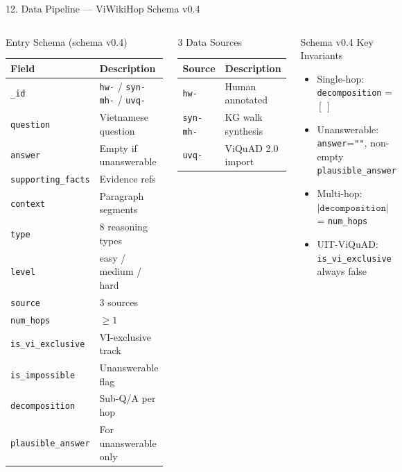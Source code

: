 \documentclass[aspectratio=169]{beamer}
\begin{document}
\begin{frame}[shrink=20]{12. Data Pipeline — ViWikiHop Schema v0.4}
\begin{columns}[T]
\begin{block}{Entry Schema (schema v0.4)}
{\scriptsize
\begin{tabular}{@{}lp{3.2cm}@{}}
\toprule
\textbf{Field} & \textbf{Description} \\
\midrule
\texttt{\_id}           & \texttt{hw-} / \texttt{syn-mh-} / \texttt{uvq-} \\
\texttt{question}       & Vietnamese question \\
\texttt{answer}         & Empty if unanswerable \\
\texttt{supporting\_facts} & Evidence refs \\
\texttt{context}        & Paragraph segments \\
\texttt{type}           & 8 reasoning types \\
\texttt{level}          & easy / medium / hard \\
\texttt{source}         & 3 sources \\
\texttt{num\_hops}      & $\geq 1$ \\
\texttt{is\_vi\_exclusive} & VI-exclusive track \\
\texttt{is\_impossible} & Unanswerable flag \\
\texttt{decomposition}  & Sub-Q/A per hop \\
\texttt{plausible\_answer} & For unanswerable only \\
\bottomrule
\end{tabular}
}
\end{block}

\begin{block}{3 Data Sources}
\begin{tabular}{@{}ll@{}}
\toprule
\textbf{Source} & \textbf{Description} \\
\midrule
\texttt{hw-}      & Human annotated \\
\texttt{syn-mh-}  & KG walk synthesis \\
\texttt{uvq-}     & ViQuAD 2.0 import \\
\bottomrule
\end{tabular}
\end{block}

\begin{alertblock}{Schema v0.4 Key Invariants}
\begin{itemize}\scriptsize\setlength\itemsep{2pt}
  \item Single-hop: \texttt{decomposition} = $[\,]$
  \item Unanswerable: \texttt{answer}=\texttt{""}, non-empty \texttt{plausible\_answer}
  \item Multi-hop: $|\texttt{decomposition}|$ = \texttt{num\_hops}
  \item UIT-ViQuAD: \texttt{is\_vi\_exclusive} always false
\end{itemize}
\end{alertblock}
\end{columns}
\end{frame}
\end{document}
